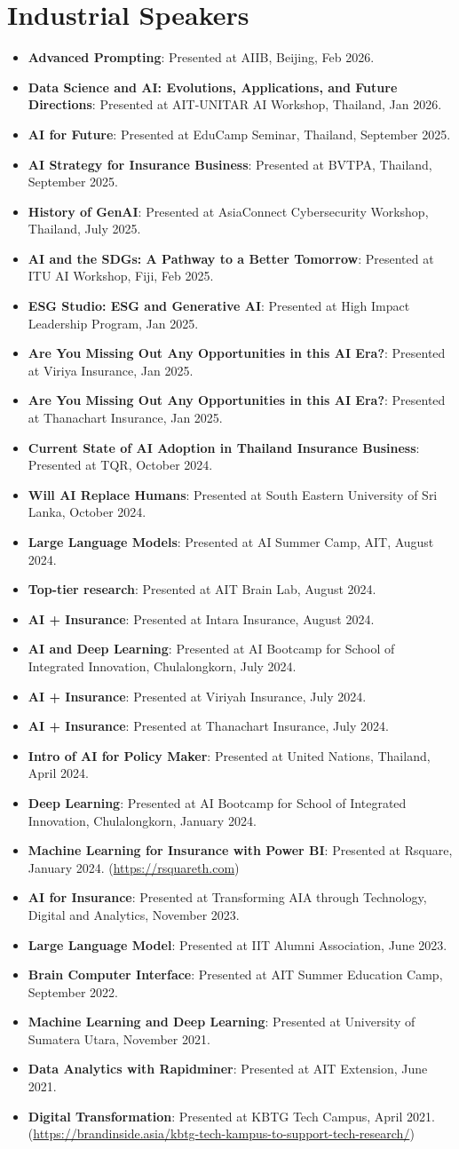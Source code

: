 \documentclass[letterpaper,11pt]{article}
\newcommand{\resumeItem}[2]{
  \item\small{
    \textbf{#1}{: #2 \vspace{-2pt}}
  }
}
\newcommand{\resumeSubItem}[2]{\resumeItem{#1}{#2}\vspace{-4pt}}
\newcommand{\resumeSubHeadingListStart}{\begin{itemize}[leftmargin=*]}
\newcommand{\resumeSubHeadingListEnd}{\end{itemize}}
\begin{document}
\section*{Industrial Speakers}
\resumeSubHeadingListStart
\resumeSubItem{Advanced Prompting}
{Presented at AIIB, Beijing, Feb 2026.}
\resumeSubItem{Data Science and AI: Evolutions, Applications, and Future Directions}
{Presented at AIT-UNITAR AI Workshop, Thailand, Jan 2026.}
\resumeSubItem{AI for Future}
{Presented at EduCamp Seminar, Thailand, September 2025.}
\resumeSubItem{AI Strategy for Insurance Business}
{Presented at BVTPA, Thailand, September 2025.}
\resumeSubItem{History of GenAI}
{Presented at AsiaConnect Cybersecurity Workshop, Thailand, July 2025.}
\resumeSubItem{AI and the SDGs: A Pathway to a Better Tomorrow}
{Presented at ITU AI Workshop, Fiji, Feb 2025.}
\resumeSubItem{ESG Studio:  ESG and Generative AI}
{Presented at High Impact Leadership Program, Jan 2025.}
\resumeSubItem{Are You Missing Out Any Opportunities in this AI Era?}
{Presented at Viriya Insurance, Jan 2025.}
\resumeSubItem{Are You Missing Out Any Opportunities in this AI Era?}
{Presented at Thanachart Insurance, Jan 2025.}
\resumeSubItem{Current State of AI Adoption in Thailand Insurance Business}
{Presented at TQR, October 2024.}
\resumeSubItem{Will AI Replace Humans}
{Presented at South Eastern University of Sri Lanka, October 2024.}
\resumeSubItem{Large Language Models}
{Presented at AI Summer Camp, AIT, August 2024.}
\resumeSubItem{Top-tier research}
{Presented at AIT Brain Lab, August 2024.}
\resumeSubItem{AI + Insurance}
{Presented at Intara Insurance, August 2024.}
\resumeSubItem{AI and Deep Learning}
{Presented at AI Bootcamp for School of Integrated Innovation, Chulalongkorn, July 2024.}
\resumeSubItem{AI + Insurance}
{Presented at Viriyah Insurance, July 2024.}
\resumeSubItem{AI + Insurance}
{Presented at Thanachart Insurance, July 2024.}
\resumeSubItem{Intro of AI for Policy Maker}
{Presented at United Nations, Thailand, April 2024.}
\resumeSubItem{Deep Learning}
{Presented at AI Bootcamp for School of Integrated Innovation, Chulalongkorn, January 2024.}
\resumeSubItem{Machine Learning for Insurance with Power BI}
{Presented at Rsquare, January 2024. (\url{https://rsquareth.com})}
\resumeSubItem{AI for Insurance}
{Presented at Transforming AIA through Technology, Digital and Analytics, November 2023.}
\resumeSubItem{Large Language Model}
{Presented at IIT Alumni Association, June 2023.}
\resumeSubItem{Brain Computer Interface}
{Presented at AIT Summer Education Camp, September 2022.}
\resumeSubItem{Machine Learning and Deep Learning}
{Presented at University of Sumatera Utara, November 2021.}
\resumeSubItem{Data Analytics with Rapidminer}
{Presented at AIT Extension, June 2021.}
\resumeSubItem{Digital Transformation}
{Presented at KBTG Tech Campus, April 2021. (\url{https://brandinside.asia/kbtg-tech-kampus-to-support-tech-research/})}
\resumeSubHeadingListEnd
\end{document}
